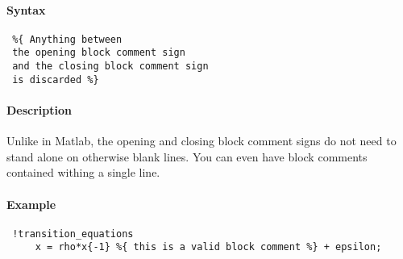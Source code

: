 


	\paragraph{Syntax}
 
 \begin{verbatim}
 %{ Anything between
 the opening block comment sign
 and the closing block comment sign
 is discarded %}
 \end{verbatim}
 
 \paragraph{Description}
 
 Unlike in Matlab, the opening and closing block comment signs do not
 need to stand alone on otherwise blank lines. You can even have block
 comments contained withing a single line.
 
 \paragraph{Example}
 
 \begin{verbatim}
 !transition_equations
     x = rho*x{-1} %{ this is a valid block comment %} + epsilon;
 \end{verbatim}


